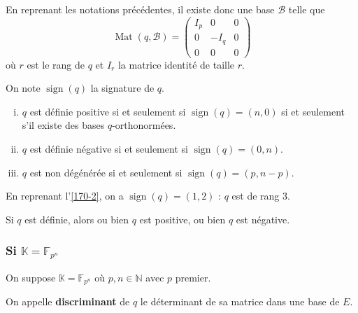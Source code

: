 	\begin{remark}
		En reprenant les notations précédentes, il existe donc une base $\mathcal{B}$ telle que
		\[
		\operatorname{Mat}(q, \mathcal{B}) =
		\begin{pmatrix}
			I_p & 0 & 0 \\
			0 & -I_q & 0 \\
			0 & 0 & 0
		\end{pmatrix}
		\]
		où $r$ est le rang de $q$ et $I_r$ la matrice identité de taille $r$.
	\end{remark}
	
	
	\begin{corollary}
		On note $\operatorname{sign}(q)$ la signature de $q$.
		\begin{enumerate}[(i)]
			\item $q$ est définie positive si et seulement si $\operatorname{sign}(q) = (n, 0)$ si et seulement s'il existe des bases $q$-orthonormées.
			\item $q$ est définie négative si et seulement si $\operatorname{sign}(q) = (0, n)$.
			\item $q$ est non dégénérée si et seulement si $\operatorname{sign}(q) = (p, n-p)$.
		\end{enumerate}
	\end{corollary}
	
	
	\begin{example}
		En reprenant l'\cref{170-2}, on a $\operatorname{sign}(q) = (1,2)$ : $q$ est de rang $3$.
	\end{example}
	
	\begin{proposition}
		Si $q$ est définie, alors ou bien $q$ est positive, ou bien $q$ est négative.
	\end{proposition}
	
	\subsubsection{Si \texorpdfstring{$\mathbb{K} = \mathbb{F}_{p^n}$}{K = Fₚₙ}}
	
	On suppose $\mathbb{K} = \mathbb{F}_{p^n}$ où $p, n \in \mathbb{N}$ avec $p$ premier.
	
	
	\begin{definition}
		On appelle \textbf{discriminant} de $q$ le déterminant de sa matrice dans une base de $E$.
	\end{definition}
	
